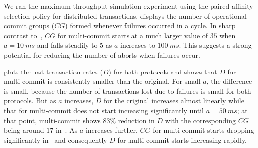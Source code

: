 
We ran the maximum throughput simulation experiment using the paired affinity selection policy for distributed
transactions.  displays the number of operational commit groups ($CG$) formed whenever failures
occurred in a cycle. In sharp contrast to~, $CG$ for multi-commit starts at a much larger 
value of $35$ when $a=10 ~ms$ and falls steadily to $5$ as $a$ increases to $100 ~ms$. This suggests a strong 
potential for reducing the number of aborts when failures occur. 

 plots the lost transaction rates ($D$) for both protocols and shows that $D$ for multi-commit 
is consistently smaller than the original. 
For small $a$, the difference is small, because the number of transactions lost due to failures is small for both
protocols.
But as $a$ increases, $D$ for the original increases almost linearly while that for multi-commit does not 
start increasing significantly until $a=50~ms$; at that point, multi-commit shows 83\% reduction in $D$ with 
the corresponding $CG$ being around $17$ in~. As $a$ increases further, $CG$ for multi-commit 
starts dropping significantly in~ and consequently $D$ for multi-commit starts increasing rapidly.

